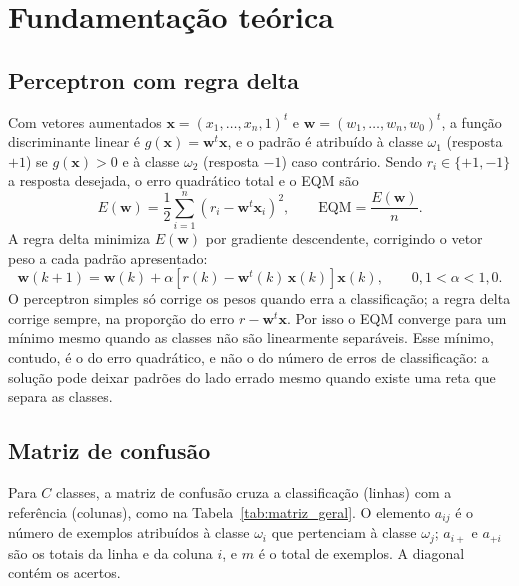 \documentclass[12pt,a4paper]{article}
\begin{document}
\section{Fundamentação teórica}\label{sec:teoria}

\subsection{Perceptron com regra delta}\label{sec:regra_delta}

Com vetores aumentados $\mathbf{x} = (x_1, \dots, x_n, 1)^t$ e $\mathbf{w} = (w_1, \dots, w_n, w_0)^t$, a função discriminante linear é $g(\mathbf{x}) = \mathbf{w}^t\mathbf{x}$, e o padrão é atribuído à classe $\omega_1$ (resposta $+1$) se $g(\mathbf{x}) > 0$ e à classe $\omega_2$ (resposta $-1$) caso contrário. Sendo $r_i \in \{+1, -1\}$ a resposta desejada, o erro quadrático total e o EQM são
\begin{equation}
  E(\mathbf{w}) = \frac{1}{2}\sum_{i=1}^{n} \left(r_i - \mathbf{w}^t\mathbf{x}_i\right)^2,
  \qquad \text{EQM} = \frac{E(\mathbf{w})}{n}.
  \label{eq:eqm}
\end{equation}
A regra delta minimiza $E(\mathbf{w})$ por gradiente descendente, corrigindo o vetor peso a cada padrão apresentado:
\begin{equation}
  \mathbf{w}(k+1) = \mathbf{w}(k) + \alpha\left[r(k) - \mathbf{w}^t(k)\,\mathbf{x}(k)\right]\mathbf{x}(k),
  \qquad 0{,}1 < \alpha < 1{,}0.
  \label{eq:regra_delta}
\end{equation}
O perceptron simples só corrige os pesos quando erra a classificação; a regra delta corrige sempre, na proporção do erro $r - \mathbf{w}^t\mathbf{x}$. Por isso o EQM converge para um mínimo mesmo quando as classes não são linearmente separáveis. Esse mínimo, contudo, é o do erro quadrático, e não o do número de erros de classificação: a solução pode deixar padrões do lado errado mesmo quando existe uma reta que separa as classes.

\subsection{Matriz de confusão}

Para $C$ classes, a matriz de confusão cruza a classificação (linhas) com a referência (colunas), como na Tabela~\ref{tab:matriz_geral}. O elemento $a_{ij}$ é o número de exemplos atribuídos à classe $\omega_i$ que pertenciam à classe $\omega_j$; $a_{i+}$ e $a_{+i}$ são os totais da linha e da coluna $i$, e $m$ é o total de exemplos. A diagonal contém os acertos.
\end{document}
